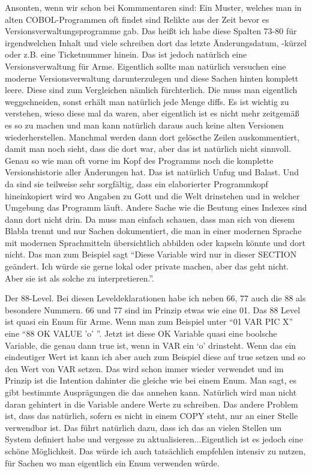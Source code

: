 {Ansonten, wenn wir schon bei Kommmentaren sind: Ein Muster, welches man in alten COBOL-Programmen oft findet sind Relikte aus der Zeit bevor es Versionsverwaltungsprogramme gab. Das heißt ich habe diese Spalten 73-80 für irgendwelchen Inhalt und viele schreiben dort das letzte Änderungsdatum, -kürzel oder z.B. eine Ticketnummer hinein. Das ist jedoch natürlich eine Versionsverwaltung für Arme. Eigentlich sollte man natürlich versuchen eine moderne Versionsverwaltung darunterzulegen und diese Sachen hinten komplett leere. Diese sind zum Vergleichen nämlich fürchterlich. Die muss man eigentlich weggschneiden, sonst erhält man natürlich jede Menge diffs. Es ist wichtig zu verstehen, wieso diese mal da waren, aber eigentlich ist es nicht mehr zeitgemäß es so zu machen und man kann natürlich daraus auch keine alten Versionen wiederherstellen. Manchmal werden dann dort gelöscthe Zeilen auskommentiert, damit man noch sieht, dass die dort war, aber das ist natürlich nicht sinnvoll. Genau so wie man oft vorne im Kopf des Programms noch die komplette Versionshistorie aller Änderungen hat. Das ist natürlich Unfug und Balast. Und da sind sie teilweise sehr sorgfältig, dass ein elaborierter Programmkopf hineinkopiert wird wo Angaben zu Gott und die Welt drinstehen und in welcher Umgebung das Programm läuft. Andere Sache wie die Beutung eines Indexes sind dann dort nicht drin. Da muss man einfach schauen, dass man sich von diesem Blabla trennt und nur Sachen dokumentiert, die man in einer modernen Sprache mit modernen Sprachmitteln übersichtlich abbilden oder kapseln könnte und dort nicht. Das man zum Beispiel sagt ``Diese Variable wird nur in dieser SECTION geändert. Ich würde sie gerne lokal oder private machen, aber das geht nicht. Aber sie ist als solche zu interpretieren.''.
\medskip

Der 88-Level. Bei diesen Leveldeklarationen habe ich neben 66, 77 auch die 88 als besondere Nummern. 66 und 77 sind im Prinzip etwas wie eine 01. Das 88 Level ist quasi ein Enum für Arme. Wenn man zum Beispiel unter ``01 VAR PIC X'' eine ``88 OK VALUE 'o' ''. Jetzt ist diese OK Variable quasi eine boolsche Variable, die genau dann true ist, wenn in VAR ein `o' drinsteht. Wenn das ein eindeutiger Wert ist kann ich aber auch zum Beispiel diese auf true setzen und so den Wert von VAR setzen. Das wird schon immer wieder verwendet und im Prinzip ist die Intention dahinter die gleiche wie bei einem Enum. Man sagt, es gibt bestimmte Ausprägungen die das annehen kann. Natürlich wird man nicht daran gehintert in die Variable andere Werte zu schreiben. Das andere Problem ist, dass das natürlich, sofern es nicht in einem COPY steht, nur an einer Stelle verwendbar ist. Das führt natürlich dazu, dass ich das an vielen Stellen um System definiert habe und vergesse zu aktualisieren...Eigentlich ist es jedoch eine schöne Möglichkeit. Das würde ich auch tatsächlich empfehlen intensiv zu nutzen, für Sachen wo man eigentlich ein Enum verwenden würde. }  

